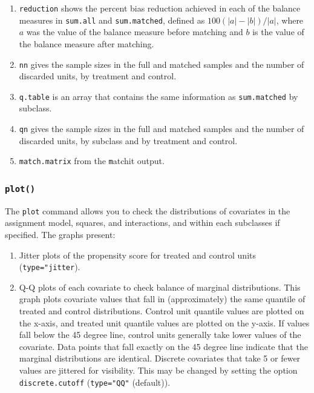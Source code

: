 \documentclass[oneside,letterpaper,titlepage]{article}
\begin{document}
\begin{enumerate}
\item \texttt{reduction} shows the percent bias reduction achieved in
  each of the balance measures in \texttt{sum.all} and
  \texttt{sum.matched}, defined as $100(|a|-|b|)/|a|$, where $a$ was
  the value of the balance measure before matching and $b$ is the
  value of the balance measure after matching.

\item \texttt{nn} gives the sample sizes in the full and matched
  samples and the number of discarded units, by treatment and control.
  
\item \texttt{q.table} is an array that contains the same information
  as \texttt{sum.matched} by subclass.
  
\item \texttt{qn} gives the sample sizes in the full and matched
  samples and the number of discarded units, by subclass and by treatment and control.
\item \texttt{match.matrix} from the {\texttt matchit} output.
\end{enumerate}

\subsubsection{{\tt plot()}}

The \texttt{plot} command allows you to check the distributions of
covariates in the assignment model, squares, and interactions, and
within each subclasses if specified.  The graphs present:
\begin{enumerate}
\item Jitter plots of the propensity score for treated and control
  units (\texttt{type="jitter}).
\item Q-Q plots of each covariate to check balance of marginal
  distributions.  This graph plots covariate values that fall in
  (approximately) the same quantile of treated and control
  distributions.  Control unit quantile values are plotted on the
  x-axis, and treated unit quantile values are plotted on the y-axis.
  If values fall below the 45 degree line, control units generally
  take lower values of the covariate.  Data points that fall exactly
  on the 45 degree line indicate that the marginal distributions are
  identical.  Discrete covariates that take 5 or fewer values are
  jittered for visibility.  This may be changed by setting the option
  \texttt{discrete.cutoff} (\texttt{type="QQ"} (default)).
\end{enumerate}
\end{document}
